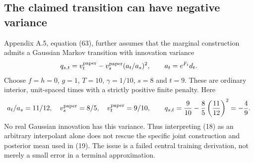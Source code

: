 \documentclass[10pt]{article}
\begin{document}
\subsection*{The claimed transition can have negative variance}
Appendix A.5, equation (63), further assumes that the marginal construction admits a Gaussian Markov transition with innovation variance \[q_{s,t}=v_t^{\rm paper}-v_s^{\rm paper}(a_t/a_s)^2,
 \qquad a_t=e^{F_t}d_t.\] Choose \(f=h=0\), \(g=1\), \(T=10\), \(\gamma=1/10\), \(s=8\) and \(t=9\). These are ordinary interior, unit-spaced times with a strictly positive finite penalty. Here \[a_t/a_s=11/12,\quad v_s^{\rm paper}=8/5,\quad
 v_t^{\rm paper}=9/10,
 \qquad q_{s,t}=\frac9{10}-\frac85\left(\frac{11}{12}\right)^2=-\frac49.\] No real Gaussian innovation has this variance. Thus interpreting (18) as an arbitrary interpolant alone does not rescue the specific joint construction and posterior mean used in (19). The issue is a failed central training derivation, not merely a small error in a terminal approximation.\par
\end{document}
